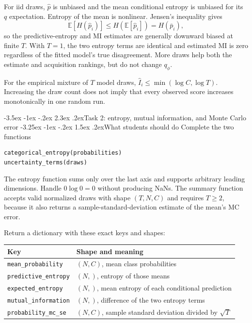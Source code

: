 \documentclass[11pt,a4paper]{article}
\makeatletter
\newcommand{\E}{\mathbb E}
\renewcommand\section{\@startsection{section}{1}{\z@}%
  {-3.5ex \@plus -1ex \@minus -.2ex}%
  {2.3ex \@plus .2ex}{\normalfont\Large}}
\renewcommand\subsection{\@startsection{subsection}{2}{\z@}%
  {-3.25ex \@plus -1ex \@minus -.2ex}%
  {1.5ex \@plus .2ex}{\normalfont\large}}
\makeatother
\begin{document}
For iid draws, $\widehat p$ is unbiased and the mean conditional entropy is
unbiased for its $q$ expectation. Entropy of the mean is nonlinear. Jensen's
inequality gives
\[
 \E[H(\widehat p_i)]\leq H(\E[\widehat p_i])=H(\bar p_i),
\]
so the predictive-entropy and MI estimates are generally downward biased at
finite $T$. With $T=1$, the two entropy terms are identical and estimated MI
is zero regardless of the fitted model's true disagreement. More draws help
both the estimate and acquisition rankings, but do not change $q_\phi$.

For the empirical mixture of $T$ model draws,
$\widehat I_i\leq\min(\log C,\log T)$. Increasing the draw count does not imply
that every observed score increases monotonically in one random run.

\FloatBarrier
\section{Task 2: entropy, mutual information, and Monte Carlo error}
\subsection{What students should do}
Complete the two functions
\begin{lstlisting}
categorical_entropy(probabilities)
uncertainty_terms(draws)
\end{lstlisting}
The entropy function sums only over the last axis and supports arbitrary
leading dimensions. Handle $0\log0=0$ without producing NaNs. The summary
function accepts valid normalized draws with shape $(T,N,C)$ and requires
$T\geq2$, because it also returns a sample-standard-deviation estimate of the
mean's MC error.

Return a dictionary with these exact keys and shapes:
\begin{center}
\begin{tabular}{@{}ll@{}}
\toprule
Key & Shape and meaning \\
\midrule
\texttt{mean\_probability} & $(N,C)$, mean class probabilities \\
\texttt{predictive\_entropy} & $(N,)$, entropy of those means \\
\texttt{expected\_entropy} & $(N,)$, mean entropy of each conditional prediction \\
\texttt{mutual\_information} & $(N,)$, difference of the two entropy terms \\
\texttt{probability\_mc\_se} & $(N,C)$, sample standard deviation divided by $\sqrt T$ \\
\bottomrule
\end{tabular}
\end{center}
\end{document}
